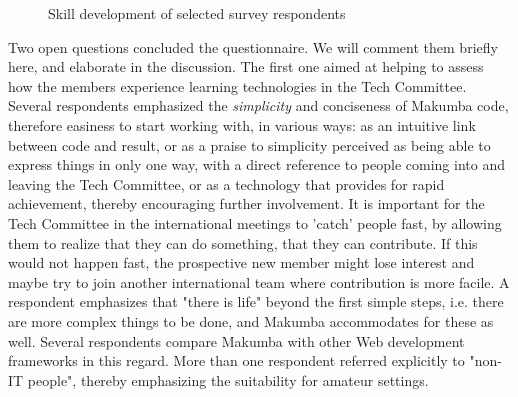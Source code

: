 \documentclass{sig-alt-release2}
\begin{document}
\begin{figure}
  \label{fig:learning-members}
  \caption{Skill development of selected survey respondents}
\end{figure} 




Two open questions concluded the questionnaire. We will comment them briefly here, and elaborate in the discussion. The first one aimed at helping to assess how the members experience learning technologies in the Tech Committee. Several respondents emphasized the \textit{simplicity} and conciseness of Makumba code, therefore easiness to start working with, in various ways: as an intuitive link between code and result,  or as a praise to simplicity perceived as being able to express things in only one way, with a direct reference to people coming into and leaving the Tech Committee,  or as a technology that provides for rapid achievement, thereby encouraging further involvement. It is important for the Tech Committee in the international meetings to 'catch' people fast, by allowing them to realize that they can do something, that they can contribute. If this would not happen fast, the prospective new member might lose interest and maybe try to join another international team where contribution is more facile. A respondent emphasizes that "there is life" beyond the first simple steps, i.e. there are more complex things to be done, and Makumba accommodates for these as well. Several respondents compare Makumba with other Web development frameworks in this regard. More than one respondent referred explicitly to "non-IT people", thereby emphasizing the suitability for amateur settings.
\end{document}
